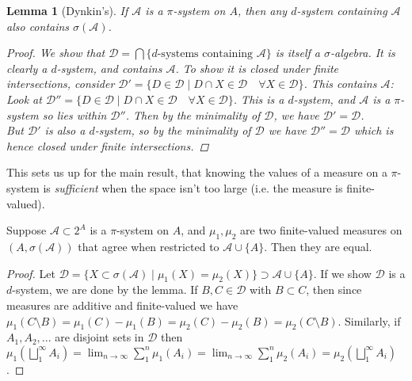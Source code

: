 \documentclass[9pt]{report}
\newlength{\tindent}
\newtheorem[L]{theorem}{Theorem}[chapter]
\newtheorem{lemma}[theorem]{Lemma}
\newtheorem[L,nocut]{definition}[theorem]{Definition}
\newtheorem[S,nounderline]{remark}[theorem]{Remarks}
\newenvironment{Proof}{ 
	\\ \setlength{\parindent}{\tindent}
\begin{proof}}
{\end{proof} \setlength{\parindent}{0pt}}
\begin{document}
\begin{lemma}[Dynkin's]
	If \(\mathcal{A}\) is a \(\pi\)-system on \(A\), then any \(d\)-system containing \(\mathcal{A}\) also contains \(\sigma(\mathcal{A})\). 
	\begin{Proof}
		We show that \(\mathcal{D}=\bigcap \{d\text{-systems containing }\mathcal{A}\}\) is itself a \(\sigma\)-algebra. It is clearly a \(d\)-system, and contains \(\mathcal{A}\). To show it is closed under finite intersections, consider \(\mathcal{D}' = \{D \in \mathcal{D}\;|\; D \cap X \in \mathcal{D} \quad \forall X \in \mathcal{D}\}\). This contains \(\mathcal{A}\):\\ 

		\noindent Look at \(\mathcal{D}'' = \{D \in \mathcal{D} \; | \; D \cap X \in \mathcal{D} \quad \forall X \in \mathcal{D}\}\). This is a \(d\)-system, and \(\mathcal{A}\) is a \(\pi\)-system so lies within \(\mathcal{D}''\). Then by the minimality of \(\mathcal{D}\), we have \(\mathcal{D}' = \mathcal{D}\). \\ 

		\noindent But \(\mathcal{D}'\) is also a \(d\)-system, so by the minimality of \(\mathcal{D}\) we have \(\mathcal{D}'' = \mathcal{D}\) which is hence closed under finite intersections.
	\end{Proof}
\end{lemma}

This sets us up for the main result, that knowing the values of a measure on a \(\pi\)-system is \emph{sufficient} when the space isn't too large (i.e. the measure is finite-valued). 
 
\begin{theorem}
	Suppose \(\mathcal{A}\subset 2^A\) is a \(\pi\)-system on \(A\), and \(\mu_1, \mu_2\) are two finite-valued measures on \((A,\sigma(\mathcal{A}))\) that agree when restricted to \(\mathcal{A}\cup \{A\}\). Then they are equal.
	\begin{Proof}
		Let \(\mathcal{D}=\{X\subset \sigma(\mathcal{A}) \; | \; \mu_1(X) = \mu_2 (X)\}\supset \mathcal{A} \cup \{A\}\). If we show \(\mathcal{D}\) is a \(d\)-system, we are done by the lemma. If \(B,C \in \mathcal{D}\) with \(B\subset C\), then since measures are additive and finite-valued we have \(\mu_1(C\setminus B) = \mu_1(C)-\mu_1(B) = \mu_2(C)-\mu_2(B) = \mu_2(C\setminus B)\). Similarly, if \(A_1, A_2,...\) are disjoint sets in \(\mathcal{D}\) then \(\mu_1(\bigsqcup_1^\infty A_i) = \lim_{n\rightarrow \infty} \sum_1^n \mu_1(A_i) =\lim_{n\rightarrow \infty} \sum_1^n \mu_2(A_i) = \mu_2(\bigsqcup_1^\infty A_i) \).
	\end{Proof}
\end{theorem}
\end{document}

